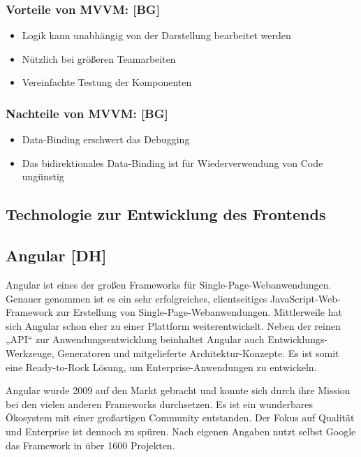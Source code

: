 \subsubsection{Vorteile von MVVM: [BG]}

\begin{itemize}
  \item Logik kann unabhängig von der Darstellung bearbeitet werden
  \item Nützlich bei größeren Teamarbeiten
  \item Vereinfachte Testung der Komponenten
\end{itemize}

\subsubsection{Nachteile von MVVM: [BG]}

\begin{itemize}
  \item Data-Binding erschwert das Debugging
  \item	Das bidirektionales Data-Binding ist für Wiederverwendung von Code ungünstig
\end{itemize}

\cite{mvcBild} \cite{mvcVSmvvm}

\newpage

\subsection{Technologie zur Entwicklung des Frontends}
\subsection{Angular [DH]}
Angular ist eines der großen Frameworks für Single-Page-Webanwendungen. Genauer genommen ist es ein sehr erfolgreiches, clientseitiges JavaScript-Web-Framework zur Erstellung von Single-Page-Webanwendungen. Mittlerweile hat sich Angular schon eher zu einer Plattform weiterentwickelt. Neben der reinen „API“ zur Anwendungsentwicklung beinhaltet Angular auch Entwicklungs-Werkzeuge, Generatoren und mitgelieferte Architektur-Konzepte. Es ist somit eine Ready-to-Rock Lösung, um Enterprise-Anwendungen zu entwickeln.

Angular wurde 2009 auf den Markt gebracht und konnte sich durch ihre Mission bei den vielen anderen Frameworks durchsetzen. Es ist ein wunderbares Ökosystem mit einer großartigen Community entstanden. Der Fokus auf Qualität und Enterprise ist dennoch zu spüren. Nach eigenen Angaben nutzt selbst Google das Framework in über 1600 Projekten.

